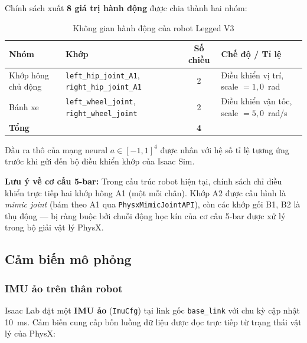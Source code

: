 Chính sách xuất \textbf{8 giá trị hành động} được chia thành hai nhóm:

\begin{table}[H]
    \centering
    \caption{Không gian hành động của robot Legged V3}
    \label{tab:action_space}
    \renewcommand{\arraystretch}{1.3}
    \begin{tabular}{|l|p{5.5cm}|c|l|}
    \hline
    \textbf{Nhóm} & \textbf{Khớp} & \textbf{Số chiều} & \textbf{Chế độ / Tỉ lệ} \\
    \hline
    Khớp hông chủ động
        & \texttt{left\_hip\_joint\_A1}, \texttt{right\_hip\_joint\_A1}
        & 2 & Điều khiển vị trí, scale $= 1{,}0$~rad \\
    Bánh xe
        & \texttt{left\_wheel\_joint}, \texttt{right\_wheel\_joint}
        & 2 & Điều khiển vận tốc, scale $= 5{,}0$~rad/s \\
    \hline
    \multicolumn{2}{|l|}{\textbf{Tổng}} & \textbf{4} & \\
    \hline
    \end{tabular}
\end{table}

Đầu ra thô của mạng neural $a \in [-1, 1]^4$ được nhân với hệ số tỉ lệ
tương ứng trước khi gửi đến bộ điều khiển khớp của Isaac Sim.

\textbf{Lưu ý về cơ cấu 5-bar:} Trong cấu trúc robot hiện tại, chính sách
chỉ điều khiển trực tiếp hai khớp hông A1 (một mỗi chân). Khớp A2 được
cấu hình là \textit{mimic joint} (bám theo A1 qua \texttt{PhysxMimicJointAPI}),
còn các khớp gối B1, B2 là thụ động — bị ràng buộc bởi chuỗi động học kín
của cơ cấu 5-bar được xử lý trong bộ giải vật lý PhysX.

\subsection{Cảm biến mô phỏng}

\subsubsection{IMU ảo trên thân robot}

Isaac Lab đặt một \textbf{IMU ảo} (\texttt{ImuCfg}) tại link gốc
\texttt{base\_link} với chu kỳ cập nhật 10~ms. Cảm biến cung cấp bốn luồng
dữ liệu được đọc trực tiếp từ trạng thái vật lý của PhysX:

